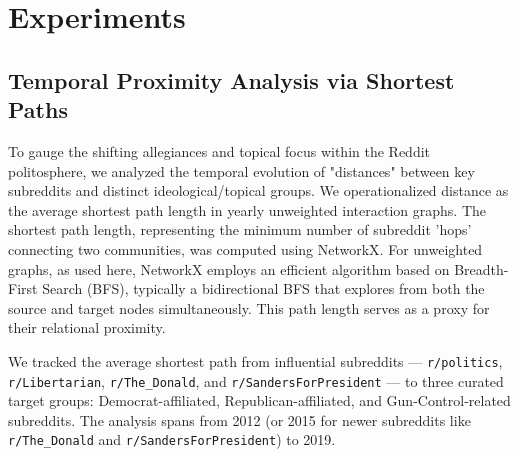 \documentclass{article}
\theoremstyle{definition}
\begin{document}

\section{Experiments}

\subsection{Temporal Proximity Analysis via Shortest Paths}
To gauge the shifting allegiances and topical focus within the Reddit politosphere, we analyzed the temporal evolution of "distances" between key subreddits and distinct ideological/topical groups. We operationalized distance as the average shortest path length in yearly unweighted interaction graphs. The shortest path length, representing the minimum number of subreddit 'hops' connecting two communities, was computed using NetworkX. For unweighted graphs, as used here, NetworkX employs an efficient algorithm based on Breadth-First Search (BFS), typically a bidirectional BFS that explores from both the source and target nodes simultaneously. This path length serves as a proxy for their relational proximity.

We tracked the average shortest path from influential subreddits --- \texttt{r/politics}, \texttt{r/Libertarian}, \texttt{r/The\_Donald}, and \texttt{r/SandersForPresident} --- to three curated target groups: Democrat-affiliated, Republican-affiliated, and Gun-Control-related subreddits. The analysis spans from 2012 (or 2015 for newer subreddits like \texttt{r/The\_Donald} and \texttt{r/SandersForPresident}) to 2019.
\newpage
\end{document}
